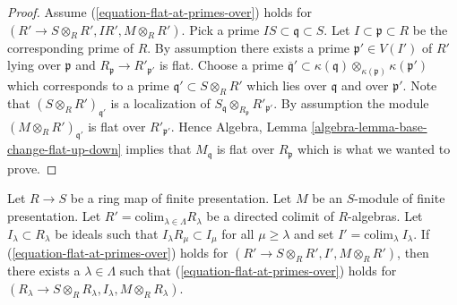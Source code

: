 \begin{proof}
Assume (\ref{equation-flat-at-primes-over}) holds for
$(R' \to S \otimes_R R', IR', M \otimes_R R')$. Pick a prime
$IS \subset \mathfrak q \subset S$. Let $I \subset \mathfrak p \subset R$
be the corresponding prime of $R$. By assumption there exists
a prime $\mathfrak p' \in V(I')$ of $R'$ lying over $\mathfrak p$ and
$R_{\mathfrak p} \to R'_{\mathfrak p'}$ is flat. Choose a prime
$\overline{\mathfrak q}' \subset
\kappa(\mathfrak q) \otimes_{\kappa(\mathfrak p)} \kappa(\mathfrak p')$
which corresponds to a prime $\mathfrak q' \subset S \otimes_R R'$ which
lies over $\mathfrak q$ and over $\mathfrak p'$. Note that
$(S \otimes_R R')_{\mathfrak q'}$ is a localization of
$S_{\mathfrak q} \otimes_{R_{\mathfrak p}} R'_{\mathfrak p'}$.
By assumption the module $(M \otimes_R R')_{\mathfrak q'}$ is
flat over $R'_{\mathfrak p'}$. Hence
Algebra, Lemma \ref{algebra-lemma-base-change-flat-up-down}
implies that $M_{\mathfrak q}$ is flat over $R_{\mathfrak p}$
which is what we wanted to prove.
\end{proof}

\begin{lemma}
\label{lemma-limit-preserving-flat-at-primes-over}
Let $R \to S$ be a ring map of finite presentation.
Let $M$ be an $S$-module of finite presentation.
Let $R' = \text{colim}_{\lambda \in \Lambda} R_\lambda$
be a directed colimit of $R$-algebras. Let $I_\lambda \subset R_\lambda$
be ideals such that $I_\lambda R_\mu \subset I_\mu$ for all $\mu \geq \lambda$
and set $I' = \text{colim}_\lambda\ I_\lambda$.
If (\ref{equation-flat-at-primes-over}) holds for
$(R' \to S \otimes_R R', I', M \otimes_R R')$, then there exists
a $\lambda \in \Lambda$ such that
(\ref{equation-flat-at-primes-over}) holds for
$(R_\lambda \to S \otimes_R R_\lambda, I_\lambda, M \otimes_R R_\lambda)$.
\end{lemma}

